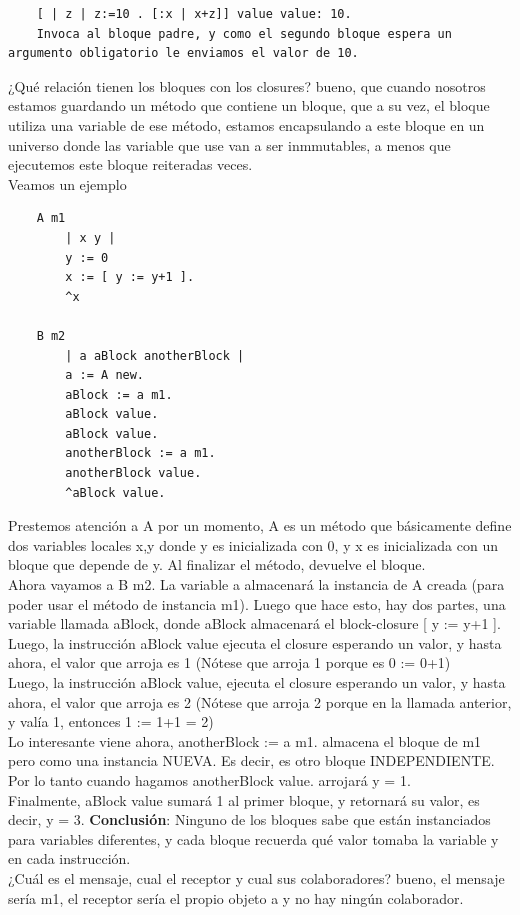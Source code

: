 \documentclass[10pt,a4paper]{article}
\begin{document}
\begin{lstlisting}
    [ | z | z:=10 . [:x | x+z]] value value: 10.
    Invoca al bloque padre, y como el segundo bloque espera un argumento obligatorio le enviamos el valor de 10. 
\end{lstlisting}
¿Qué relación tienen los bloques con los closures? bueno, que cuando nosotros estamos guardando un método que contiene un bloque, que a su vez, el bloque utiliza una variable de ese método, estamos encapsulando a este bloque en un universo donde las variable que use van a ser inmmutables, a menos que ejecutemos este bloque reiteradas veces. \\
Veamos un ejemplo 
\begin{lstlisting}
    A m1 
        | x y |
        y := 0
        x := [ y := y+1 ].
        ^x

    B m2
        | a aBlock anotherBlock |
        a := A new.
        aBlock := a m1. 
        aBlock value. 
        aBlock value. 
        anotherBlock := a m1.
        anotherBlock value. 
        ^aBlock value.
\end{lstlisting}
Prestemos atención a A por un momento, A es un método que básicamente define dos variables locales x,y donde y es inicializada con 0, y x es inicializada con un bloque que depende de y. Al finalizar el método, devuelve el bloque. \\
Ahora vayamos a B m2. La variable a almacenará la instancia de A creada (para poder usar el método de instancia m1). Luego que hace esto, hay dos partes, una variable llamada aBlock, donde aBlock almacenará el block-closure [ y := y+1 ]. \\
Luego, la instrucción aBlock value ejecuta el closure esperando un valor, y hasta ahora, el valor que arroja es 1 (Nótese que arroja 1 porque es 0 := 0+1) \\
Luego, la instrucción aBlock value, ejecuta el closure esperando un valor, y hasta ahora, el valor que arroja es 2 (Nótese que arroja 2 porque en la llamada anterior, y valía 1, entonces 1 := 1+1 = 2) \\
Lo interesante viene ahora, anotherBlock := a m1. almacena el bloque de m1 pero como una instancia NUEVA. Es decir, es otro bloque INDEPENDIENTE. \\
Por lo tanto cuando hagamos anotherBlock value. arrojará y = 1. \\
Finalmente, aBlock value sumará 1 al primer bloque, y retornará su valor, es decir, y = 3. 
\textbf{Conclusión}: Ninguno de los bloques sabe que están instanciados para variables diferentes, y cada bloque recuerda qué valor tomaba la variable y en cada instrucción. \\
¿Cuál es el mensaje, cual el receptor y cual sus colaboradores? bueno, el mensaje sería m1, el receptor sería el propio objeto a y no hay ningún colaborador.
\end{document}
